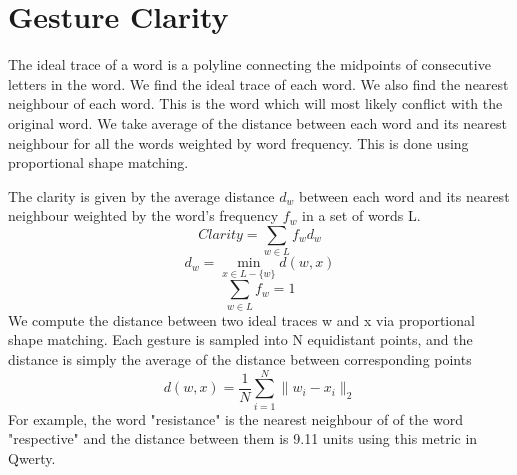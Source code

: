 \documentclass[MTech]{iitmdiss}
\begin{document}
\section{Gesture Clarity}
The ideal trace of a word is a polyline connecting the midpoints of consecutive letters in the word. We find the ideal trace of each word. We also find the nearest neighbour of each word. This is the word which will most likely conflict with the original word. We take average of the distance between each word and its nearest neighbour for all the words weighted by word frequency. This is done using proportional shape matching.

The clarity is given by the average distance $d_{w}$ between each word and its nearest neighbour weighted by the word's frequency $f_{w}$ in a set of words L.
\begin{equation}Clarity=\sum_{w \in L} f_{w} d_{w}\end{equation}
\begin{equation} d_{w}= \min_{x \in L - \{w\} } d(w,x) \end{equation} 
\begin{equation} \sum_{w \in L } f_{w} = 1\end{equation}
We compute the distance between two ideal traces w and x via proportional shape matching. Each gesture is sampled into N equidistant points, and the distance is simply the average of the distance between corresponding points
\begin{equation}
d(w,x) = \frac{1}{N} \sum_{i=1}^{N} \| w_{i} - x_{i} \|_{2}
\end{equation}
For example, the word "resistance" is the nearest neighbour of of the word "respective" and the distance between them is 9.11 units using this metric in Qwerty. 
\end{document}
